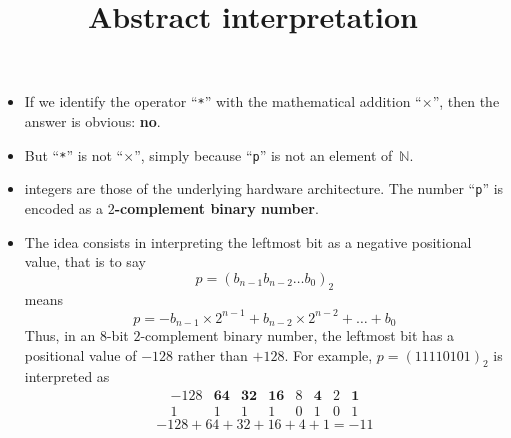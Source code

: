 \documentclass[wide]{slides}
\begin{document}
\begin{slide}
  \title{Abstract interpretation}

  \begin{itemize}

    \item If we identify the \OCaml operator ``\texttt{*}'' with the
      mathematical addition ``\(\times\)'', then the answer is
      obvious: \textbf{no}.

    \item But ``\texttt{*}'' is not ``\(\times\)'', simply because
      ``\texttt{p}'' is not an element of~\(\mathbb{N}\).

    \item \OCaml integers are those of the underlying hardware
      architecture. The number ``\texttt{p}'' is encoded as a
      \textbf{\(2\)-complement binary number}.

    \item The idea consists in interpreting the leftmost bit as a
      negative positional value, that is to say
      \begin{equation*}
        p = (b_{n-1}b_{n-2}\dots{b_0})_2
      \end{equation*}
      means
      \begin{equation*}
        p = -b_{n-1} \times 2^{n-1} + b_{n-2} \times 2^{n-2} + \dots + b_0
      \end{equation*}
      Thus, in an \(8\)-bit \(2\)-complement binary number, the
      leftmost bit has a positional value of \(-128\) rather than
      \(+128\). For example, \(p = (11110101)_2\) is interpreted as
      \begin{equation*}
        \begin{array}{rrrrrrrr}
          -128 & \mathbf{64} & \mathbf{32} & \mathbf{16} & 8 &
          \mathbf{4} & 2 & \mathbf{1}\\
          \hline
          1 &  1 &  1 &  1 & 0 & 1 & 0 & 1
        \end{array}
        \end{equation*}
      \begin{equation*}
        -128 + 64 + 32 + 16 + 4 + 1 = -11
      \end{equation*}

  \end{itemize}

\end{slide}
\end{document}
